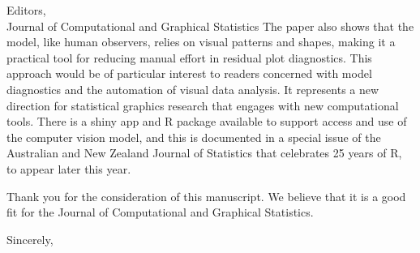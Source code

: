 \documentclass[
  12pt,
  letterpaper]{letter}
\begin{document}
\begin{letter}{Editors,\\Journal of Computational and Graphical
Statistics}
The paper also shows that the model, like human observers, relies on
visual patterns and shapes, making it a practical tool for reducing
manual effort in residual plot diagnostics. This approach would be of
particular interest to readers concerned with model diagnostics and the
automation of visual data analysis. It represents a new direction for
statistical graphics research that engages with new computational tools.
There is a shiny app and R package available to support access and use
of the computer vision model, and this is documented in a special issue
of the Australian and New Zealand Journal of Statistics that celebrates
25 years of R, to appear later this year.

Thank you for the consideration of this manuscript. We believe that it
is a good fit for the Journal of Computational and Graphical Statistics.



\closing{Sincerely,}
\vfill
\end{letter}
\end{document}
